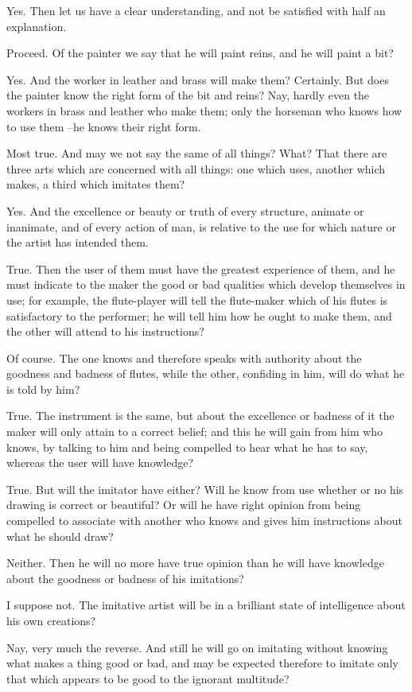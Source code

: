 Yes.
Then let us have a clear understanding, and not be satisfied with half an explanation.

Proceed.
Of the painter we say that he will paint reins, and he will paint a bit?

Yes.
And the worker in leather and brass will make them?
Certainly.
But does the painter know the right form of the bit and reins? Nay, hardly even the workers in brass and leather who make them; only the horseman who knows how to use them --he knows their right form.

Most true.
And may we not say the same of all things?
What?
That there are three arts which are concerned with all things: one which uses, another which makes, a third which imitates them?

Yes.
And the excellence or beauty or truth of every structure, animate or inanimate, and of every action of man, is relative to the use for which nature or the artist has intended them.

True.
Then the user of them must have the greatest experience of them, and he must indicate to the maker the good or bad qualities which develop themselves in use; for example, the flute-player will tell the flute-maker which of his flutes is satisfactory to the performer; he will tell him how he ought to make them, and the other will attend to his instructions?

Of course.
The one knows and therefore speaks with authority about the goodness and badness of flutes, while the other, confiding in him, will do what he is told by him?

True.
The instrument is the same, but about the excellence or badness of it the maker will only attain to a correct belief; and this he will gain from him who knows, by talking to him and being compelled to hear what he has to say, whereas the user will have knowledge?

True.
But will the imitator have either? Will he know from use whether or no his drawing is correct or beautiful? Or will he have right opinion from being compelled to associate with another who knows and gives him instructions about what he should draw?

Neither.
Then he will no more have true opinion than he will have knowledge about the goodness or badness of his imitations?

I suppose not.
The imitative artist will be in a brilliant state of intelligence about his own creations?

Nay, very much the reverse.
And still he will go on imitating without knowing what makes a thing good or bad, and may be expected therefore to imitate only that which appears to be good to the ignorant multitude?


